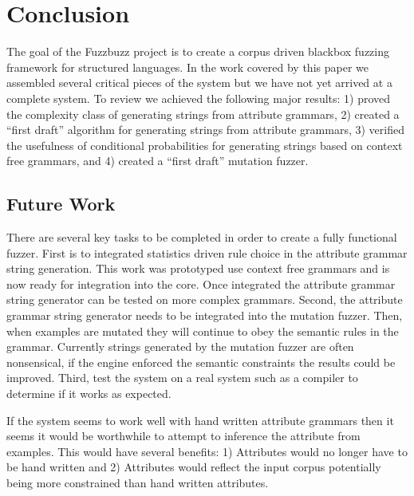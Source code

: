 \section{Conclusion}

The goal of the Fuzzbuzz project is to create a corpus driven blackbox fuzzing
framework for structured languages. In the work covered by this paper we
assembled several critical pieces of the system but we have not yet arrived at a
complete system. To review we achieved the following major results: 1) proved
the complexity class of generating strings from attribute grammars, 2) created a
``first draft'' algorithm for generating strings from attribute grammars, 3)
verified the usefulness of conditional probabilities for generating strings
based on context free grammars, and 4) created a ``first draft'' mutation
fuzzer.

\subsection{Future Work}

There are several key tasks to be completed in order to create a fully
functional fuzzer. First is to integrated statistics driven rule choice in
the attribute grammar string generation. This work was prototyped use context
free grammars and is now ready for integration into the core. Once integrated
the attribute grammar string generator can be tested on more complex grammars.
Second, the attribute grammar string generator needs to be integrated into the
mutation fuzzer. Then, when examples are mutated they will continue to obey the
semantic rules in the grammar. Currently strings generated by the mutation
fuzzer are often nonsensical, if the engine enforced the semantic constraints
the results could be improved. Third, test the system on a real system such as a
compiler to determine if it works as expected.

If the system seems to work well with hand written attribute grammars then it
seems it would be worthwhile to attempt to inference the attribute from
examples. This would have several benefits: 1) Attributes would no longer have
to be hand written and 2) Attributes would reflect the input corpus potentially
being more constrained than hand written attributes. 

